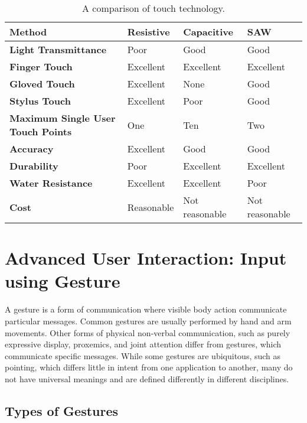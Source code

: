 \begin{table}
\label{tab:touchtech}
\begin{center}
\begin{tabular}{| p{5cm} | l | p{3cm} | l |}
\hline
\textbf{Method} & \textbf{Resistive} & \textbf{Capacitive} & \textbf{SAW} \\ \hline
\textbf{Light Transmittance} & Poor & Good & Good \\ \hline
\textbf{Finger Touch} & Excellent & Excellent & Excellent \\ \hline
\textbf{Gloved Touch} & Excellent & None & Good \\ \hline
\textbf{Stylus Touch} & Excellent & Poor & Good \\ \hline
\textbf{Maximum Single User Touch Points} & One & Ten & Two \\ \hline
\textbf{Accuracy} & Excellent & Good & Good \\ \hline
\textbf{Durability} & Poor & Excellent & Excellent \\ \hline
\textbf{Water Resistance} & Excellent & Excellent & Poor \\ \hline
\textbf{Cost} & Reasonable & Not reasonable & Not reasonable \\ \hline
\end{tabular}
\end{center}
\caption[A comparison of touch technology]{A comparison of touch technology.}
\end{table}

\section{Advanced User Interaction: Input using Gesture}

A gesture is a form of communication where visible body action communicate particular messages.
Common gestures are usually performed by hand and arm movements.
Other forms of physical non-verbal communication, such as purely expressive display, proxemics, and joint attention differ from gestures, which communicate specific messages.
While some gestures are ubiquitous, such as pointing, which differs little in intent from one application to another, many do not have universal meanings and are defined differently in different disciplines.

\subsection{Types of Gestures}

